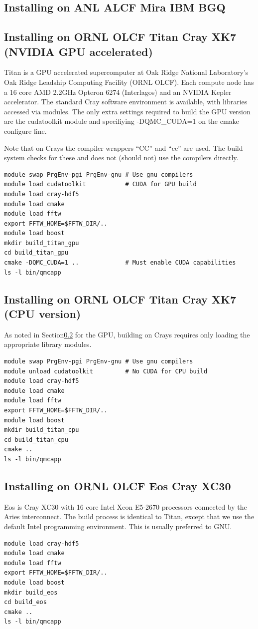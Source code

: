 \subsection{Installing on ANL ALCF Mira IBM BGQ}

\subsection{Installing on ORNL OLCF Titan Cray XK7 (NVIDIA GPU
  accelerated)}
\label{sec:titanbuildgpu}
Titan is a GPU accelerated supercomputer at Oak Ridge National
Laboratory's  Oak Ridge Leadship Computing Facility  (ORNL OLCF). Each
compute node has a 16 core AMD 2.2GHz Opteron 6274 (Interlagos) and an
NVIDIA Kepler accelerator. The standard Cray software environment is
available, with libraries accessed via modules. The only extra
settings required to build the GPU version are the cudatoolkit module
and specifiying -DQMC\_CUDA=1 on the cmake configure line.

Note that on Crays the compiler wrappers ``CC'' and ``cc'' are 
used. The build system checks for these and does not (should not) use
the compilers directly.

\begin{verbatim}
module swap PrgEnv-pgi PrgEnv-gnu # Use gnu compilers
module load cudatoolkit           # CUDA for GPU build
module load cray-hdf5
module load cmake
module load fftw
export FFTW_HOME=$FFTW_DIR/..
module load boost
mkdir build_titan_gpu
cd build_titan_gpu
cmake -DQMC_CUDA=1 ..             # Must enable CUDA capabilities
ls -l bin/qmcapp 
\end{verbatim}

\subsection{Installing on ORNL OLCF Titan Cray XK7 (CPU version)}
As noted in Section\ref{sec:titanbuildgpu} for the GPU, building on
Crays requires only loading the appropriate library modules.

\begin{verbatim}
module swap PrgEnv-pgi PrgEnv-gnu # Use gnu compilers
module unload cudatoolkit         # No CUDA for CPU build
module load cray-hdf5
module load cmake
module load fftw
export FFTW_HOME=$FFTW_DIR/..
module load boost
mkdir build_titan_cpu
cd build_titan_cpu
cmake ..
ls -l bin/qmcapp 
\end{verbatim}

\subsection{Installing on ORNL OLCF Eos Cray XC30}
Eos is Cray XC30 with 16 core Intel Xeon E5-2670 processors connected
by the Aries interconnect. The build process is identical to Titan,
except that we use the default Intel programming environment. This is
usually preferred to GNU.
\begin{verbatim}
module load cray-hdf5
module load cmake
module load fftw
export FFTW_HOME=$FFTW_DIR/..
module load boost
mkdir build_eos
cd build_eos
cmake ..
ls -l bin/qmcapp 
\end{verbatim}

